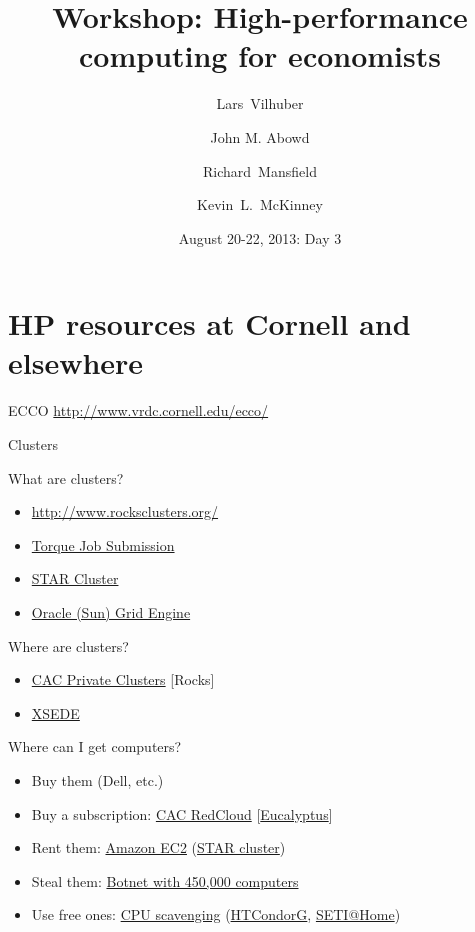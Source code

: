 \documentclass[xcolor=table,compress]{beamer}
\title[Computing for Economists]{Workshop: High-performance computing for economists}
\author[Vilhuber, Abowd, Mansfield, McKinney]{%
  Lars~Vilhuber\inst{1} \and
  John M. Abowd\inst{1} \and
  Richard~Mansfield\inst{1} \and
  Kevin~L.~McKinney %
}
\institute[Cornell]{
  \inst{1}%
   Cornell University, Economics Department,
}%
\date[August 20-22, 2013]{August 20-22, 2013: Day 3}
\begin{document}
\frame{\titlepage}

\section[HP resources]{HP resources at Cornell and elsewhere}

\begin{frame}{ECCO}
\href{http://www2.vrdc.cornell.edu/ecco/}{http://www.vrdc.cornell.edu/ecco/}
\end{frame}

\begin{frame}{Clusters}
\begin{block}{What are clusters?}
\begin{itemize}
\item \href{http://www.rocksclusters.org/wordpress/}{http://www.rocksclusters.org/}
\item \href{http://www.clusterresources.com/torquedocs21/2.1jobsubmission.shtml}{Torque Job Submission}
\item \href{http://star.mit.edu/cluster/docs/latest/index.html}{STAR Cluster}
\item \href{http://www.oracle.com/us/products/tools/oracle-grid-engine-075549.html}{Oracle (Sun) Grid Engine}
\end{itemize}
\end{block}

\end{frame}

\begin{frame}{Where are clusters?}
\begin{itemize}
\item \href{http://www.cac.cornell.edu/services/hpcsystems.aspx}{CAC Private Clusters} [Rocks]
\item \href{https://www.xsede.org/}{XSEDE}
\end{itemize}
\end{frame}


\begin{frame}{Where can I get computers?}
\begin{itemize}
\item Buy them (Dell, etc.)
\item Buy a subscription: \href{http://www.cac.cornell.edu/RedCloud/}{CAC RedCloud} [\href{http://www.eucalyptus.com/}{Eucalyptus}]
\item Rent them: \href{http://docs.aws.amazon.com/AWSEC2/latest/UserGuide/using-spot-instances-cluster.html}{Amazon EC2} (\href{http://star.mit.edu/cluster/docs/latest/quickstart.html}{STAR cluster})
\item Steal them: \href{http://en.wikipedia.org/wiki/Srizbi_botnet}{Botnet with 450,000 computers}
\item Use free ones: \href{http://en.wikipedia.org/wiki/CPU_scavenging}{CPU scavenging} \newline(\href{http://en.wikipedia.org/wiki/HTCondor}{HTCondorG}, \href{http://setiathome.berkeley.edu/}{SETI@Home})
\end{itemize}
\end{frame}
\end{document}
